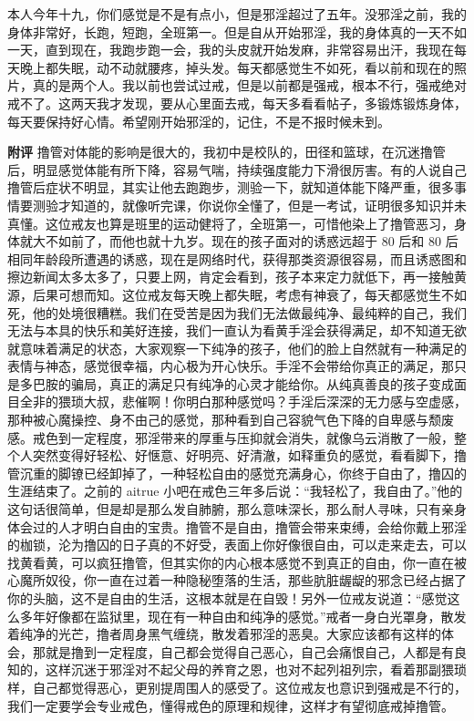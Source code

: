 \begin{case}
    本人今年十九，你们感觉是不是有点小，但是邪淫超过了五年。没邪淫之前，我的身体非常好，长跑，短跑，全班第一。但是自从开始邪淫，我的身体真的一天不如一天，直到现在，我跑步跑一会，我的头皮就开始发麻，非常容易出汗，我现在每天晚上都失眠，动不动就腰疼，掉头发。每天都感觉生不如死，看以前和现在的照片，真的是两个人。我以前也尝试过戒，但是以前都是强戒，根本不行，强戒绝对戒不了。这两天我才发现，要从心里面去戒，每天多看看帖子，多锻炼锻炼身体，每天要保持好心情。希望刚开始邪淫的，记住，不是不报时候未到。

    \textbf{附评} 撸管对体能的影响是很大的，我初中是校队的，田径和篮球，在沉迷撸管后，明显感觉体能有所下降，容易气喘，持续强度能力下滑很厉害。有的人说自己撸管后症状不明显，其实让他去跑跑步，测验一下，就知道体能下降严重，很多事情要测验才知道的，就像听完课，你说你全懂了，但是一考试，证明很多知识并未真懂。这位戒友也算是班里的运动健将了，全班第一，可惜他染上了撸管恶习，身体就大不如前了，而他也就十九岁。现在的孩子面对的诱惑远超于 80 后和 80 后相同年龄段所遭遇的诱惑，现在是网络时代，获得那类资源很容易，而且诱惑图和擦边新闻太多太多了，只要上网，肯定会看到，孩子本来定力就低下，再一接触黄源，后果可想而知。这位戒友每天晚上都失眠，考虑有神衰了，每天都感觉生不如死，他的处境很糟糕。我们在受苦是因为我们无法做最纯净、最纯粹的自己，我们无法与本具的快乐和美好连接，我们一直认为看黄手淫会获得满足，却不知道无欲就意味着满足的状态，大家观察一下纯净的孩子，他们的脸上自然就有一种满足的表情与神态，感觉很幸福，内心极为开心快乐。手淫不会带给你真正的满足，那只是多巴胺的骗局，真正的满足只有纯净的心灵才能给你。从纯真善良的孩子变成面目全非的猥琐大叔，悲催啊！你明白那种感觉吗？手淫后深深的无力感与空虚感，那种被心魔操控、身不由己的感觉，那种看到自己容貌气色下降的自卑感与颓废感。戒色到一定程度，邪淫带来的厚重与压抑就会消失，就像乌云消散了一般，整个人突然变得好轻松、好惬意、好明亮、好清澈，如释重负的感觉，看看脚下，撸管沉重的脚镣已经卸掉了，一种轻松自由的感觉充满身心，你终于自由了，撸囚的生涯结束了。之前的 aitrue 小吧在戒色三年多后说：“我轻松了，我自由了。”他的这句话很简单，但是却是那么发自肺腑，那么意味深长，那么耐人寻味，只有亲身体会过的人才明白自由的宝贵。撸管不是自由，撸管会带来束缚，会给你戴上邪淫的枷锁，沦为撸囚的日子真的不好受，表面上你好像很自由，可以走来走去，可以找黄看黄，可以疯狂撸管，但其实你的内心根本感觉不到真正的自由，你一直在被心魔所奴役，你一直在过着一种隐秘堕落的生活，那些肮脏龌龊的邪念已经占据了你的头脑，这不是自由的生活，这根本就是在自毁！另外一位戒友说道：“感觉这么多年好像都在监狱里，现在有一种自由和纯净的感觉。”戒者一身白光罩身，散发着纯净的光芒，撸者周身黑气缠绕，散发着邪淫的恶臭。大家应该都有这样的体会，那就是撸到一定程度，自己都会觉得自己恶心，自己会痛恨自己，人都是有良知的，这样沉迷于邪淫对不起父母的养育之恩，也对不起列祖列宗，看着那副猥琐样，自己都觉得恶心，更别提周围人的感受了。这位戒友也意识到强戒是不行的，我们一定要学会专业戒色，懂得戒色的原理和规律，这样才有望彻底戒掉撸管。
\end{case}

